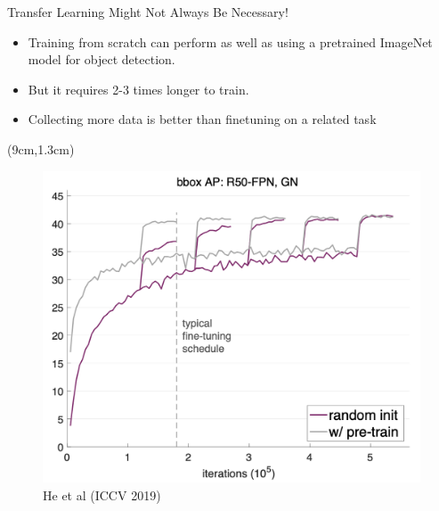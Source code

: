 \documentclass[serif, aspectratio=169]{beamer}
\begin{document}
\begin{frame}{Transfer Learning Might Not Always Be Necessary!}
	\begin{itemize}
		\item Training from scratch can perform as well \newline as using a pretrained ImageNet model for \newline object detection.
		\item But it requires 2-3 times longer to train.
		\item Collecting more data is better than \newline finetuning on a related task
	\end{itemize}
	\begin{textblock*}{5cm}(9cm,1.3cm) %
		\begin{figure}
			\includegraphics[keepaspectratio, scale=0.35]{pic/rethinking_imagenet}
			\caption*{\hspace{2cm}\scriptsize He et al (ICCV 2019)}
		\end{figure}
	\end{textblock*}
\end{frame}
\end{document}
